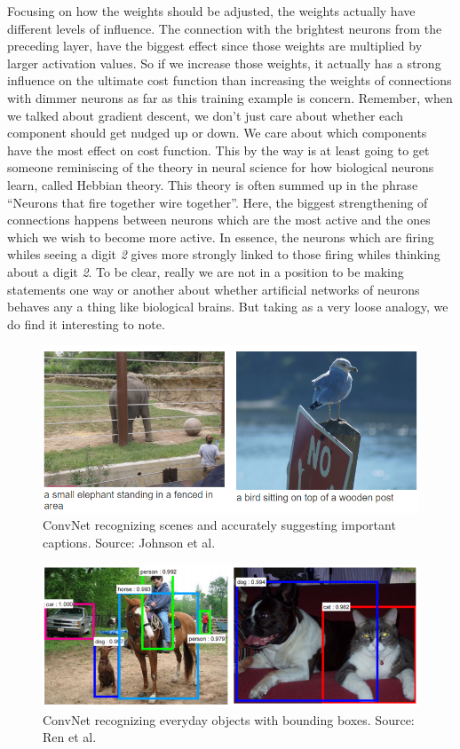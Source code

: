 \documentclass[master]{thesis-uestc}
\begin{document}
Focusing on how the weights should be adjusted, the weights actually have different levels of influence. The connection with the brightest neurons from the preceding layer, have the biggest effect since those weights are multiplied by larger activation values. So if we increase those weights, it actually has a strong influence on the ultimate cost function than increasing the weights of connections with dimmer neurons as far as this training example is concern. Remember, when we talked about gradient descent, we don't just care about whether each component should get nudged up or down. We care about which components have the most effect on cost function. This by the way is at least going to get someone reminiscing of the theory in neural science for how biological neurons learn, called Hebbian theory. This theory is often summed up in the phrase ``Neurons that fire together wire together''. Here, the biggest strengthening of connections happens between neurons which are the most active and the ones which we wish to become more active. In essence, the neurons which are firing whiles seeing a digit \textit{2} gives more strongly linked to those firing whiles thinking about a digit \textit{2}. To be clear, really we are not in a position to be making statements one way or another about whether artificial networks of neurons behaves any a thing like biological brains. But taking as a very loose analogy, we do find it interesting to note.

\begin{figure}[ht]
\includegraphics[width=5in]{pic/CNN_example.PNG}
\caption{ConvNet recognizing scenes and accurately suggesting important captions. Source: Johnson et al.}
\label{cnn_example}
\end{figure}

\begin{figure}[ht]
\includegraphics[width=5in]{pic/everyday_objects.PNG}
\caption{ConvNet recognizing everyday objects with bounding boxes. Source: Ren et al.}
\label{everyday_objects}
\end{figure}
\end{document}
